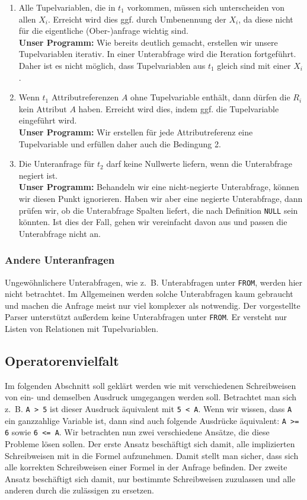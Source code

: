 \begin{enumerate}
\item Alle Tupelvariablen, die in $t_1$ vorkommen, müssen sich unterscheiden von allen $X_i$. Erreicht wird dies ggf. durch Umbenennung der $X_i$, da diese nicht für die eigentliche (Ober-)anfrage wichtig sind.\\
\textbf{Unser Programm:} Wie bereits deutlich gemacht, erstellen wir unsere Tupelvariablen iterativ. In einer Unterabfrage wird die Iteration fortgeführt. Daher ist es nicht möglich, dass Tupelvariablen aus $t_1$ gleich sind mit einer $X_i$.
\item Wenn $t_1$ Attributreferenzen $A$ ohne Tupelvariable enthält, dann dürfen die $R_i$ kein Attribut $A$ haben. Erreicht wird dies, indem ggf. die Tupelvariable eingeführt wird.\\
\textbf{Unser Programm:} Wir erstellen für jede Attributreferenz eine Tupelvariable und erfüllen daher auch die Bedingung 2.
\item Die Unteranfrage für $t_2$ darf keine Nullwerte liefern, wenn die Unterabfrage negiert ist. \\
\textbf{Unser Programm:} Behandeln wir eine nicht-negierte Unterabfrage, können wir diesen Punkt ignorieren. Haben wir aber eine negierte Unterabfrage, dann prüfen wir, ob die Unterabfrage Spalten liefert, die nach Definition \verb|NULL| sein könnten. Ist dies der Fall, gehen wir vereinfacht davon aus und passen die Unterabfrage nicht an.
\end{enumerate}

\subsubsection{Andere Unteranfragen}

Ungewöhnlichere Unterabfragen, wie \mbox{z. B.} Unterabfragen unter \verb|FROM|, werden hier nicht betrachtet. Im Allgemeinen werden solche Unterabfragen kaum gebraucht und machen die Anfrage meist nur viel komplexer als notwendig. Der vorgestellte Parser unterstützt außerdem keine Unterabfragen unter \verb|FROM|. Er versteht nur Listen von Relationen mit Tupelvariablen.

\subsection{Operatorenvielfalt}

Im folgenden Abschnitt soll geklärt werden wie mit verschiedenen Schreibweisen von ein- und demselben Ausdruck umgegangen werden soll. Betrachtet man sich \mbox{z. B.} \verb|A > 5| ist dieser Ausdruck äquivalent mit \verb|5 < A|. Wenn wir wissen, dass \verb|A| ein ganzzahlige Variable ist, dann sind auch folgende Ausdrücke äquivalent: \verb|A >= 6| sowie \verb|6 <= A|. Wir betrachten nun zwei verschiedene Ansätze, die diese Probleme lösen sollen. Der erste Ansatz beschäftigt sich damit, alle implizierten Schreibweisen mit in die Formel aufzunehmen. Damit stellt man sicher, dass sich alle korrekten Schreibweisen einer Formel in der Anfrage befinden. Der zweite Ansatz beschäftigt sich damit, nur bestimmte Schreibweisen zuzulassen und alle anderen durch die zulässigen zu ersetzen.

